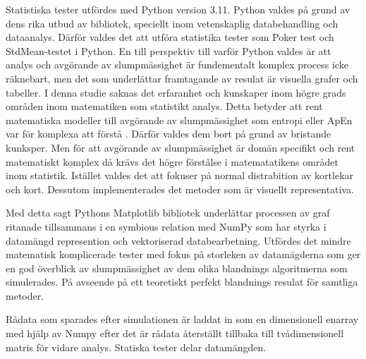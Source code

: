 \documentclass[swedish,a4paper]{article}
\begin{document}
Statistiska tester utfördes med Python version 3.11. Python valdes på
grund av dens rika utbud av bibliotek, speciellt inom
veten\-skaplig data\-behandling och data\-analys. Därför valdes det
att utföra statistika tester som Poker test och StdMean-testet i Python.
En till perspektiv till varför Python valdes är att analys och avgörande
av slumpmässighet är fundementalt komplex process icke räknebart, men det som
underlättar framtagande av resulat är visuella grafer och tabeller. I
denna studie saknas det erfaranhet och kunskaper inom högre grads
områden inom matematiken som statistikt analys. Detta betyder att rent
matematiska modeller till avgörande av slumpmässighet som entropi eller
ApEn var för komplexa att förstå \parencite{ApEn}. Därför valdes dem
bort på grund av bristande kunksper. Men för att avgörande av
slumpmässighet är domän specifikt och rent matematiskt komplex då krävs
det högre förstålse i matematatikens området inom statistik.  Istället
valdes det att fokuser på normal distrabition av kortlekar och kort.
Dessutom implementerades det metoder som är visuellt representativa.


Med detta sagt Pythons Matplotlib bibliotek underlättar processen av
graf ritanade tillsammans i en symbious relation med NumPy som har styrka i
datamängd represention och vektoriserad data\-bearbetning. Utfördes det
mindre matematisk komplicerade tester med fokus på storleken av
datamägderna som ger en god överblick av slumpmässighet av dem olika
blandnings algoritmerna som simulerades. På avseende på ett teoretiskt
perfekt blandnings resulat för samtliga metoder.


Rådata som sparades efter simulationen är laddat in som en dimensionell
\gls{enarray} med hjälp av Numpy  efter det är rådata återställt tillbaka till
tvådimensionell matris för vidare analys. Statiska tester delar
datamängden.
\end{document}
